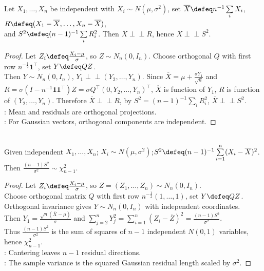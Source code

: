 \begin{theorem} \label{thm:normal-mean-residual-independence} \\
Let $X_1,\ldots,X_n$ be independent with $X_i\sim N(\mu,\sigma^2)$, set $\overline{X}\defeq n^{-1}\sum\limits_iX_i$, $R\defeq(X_1-\overline{X},\ldots,X_n-\overline{X})$,\\
and $S^2\defeq(n-1)^{-1}\sum\limits_iR_i^2$. Then $\overline{X}\perp\!\!\!\perp R$, hence $\overline{X}\perp\!\!\!\perp S^2$.
\begin{proof} Let $Z_i\defeq\frac{X_i-\mu}{\sigma}$, so $Z\sim N_n(0,I_n)$. Choose orthogonal $Q$ with first row $n^{-\frac{1}{2}}\mathbf{1}^\top$, set $Y\defeq QZ$.\\
Then $Y\sim N_n(0,I_n)$, $Y_1\perp\!\!\!\perp(Y_2,\ldots,Y_n)$. Since $\overline{X}=\mu+\frac{\sigma Y_1}{\sqrt n}$ and $R=\sigma(I-n^{-1}\mathbf{1}\mathbf{1}^\top)Z=\sigma Q^\top(0,Y_2,\ldots,Y_n)^\top$, $\overline{X}$ is function of $Y_1$, $R$ is function of $(Y_2,\ldots,Y_n)$. Therefore $\overline{X}\perp\!\!\!\perp R$, by $S^2=(n-1)^{-1}\sum\limits_iR_i^2$, $\overline{X}\perp\!\!\!\perp S^2$.\\
: Mean and residuals are orthogonal projections.\\
: For Gaussian vectors, orthogonal components are independent.
\end{proof}
\end{theorem}

\begin{theorem} \label{thm:normal-sample-variance-chi-square} \\
Given independent $X_1,\ldots,X_n$; $X_i\sim N(\mu,\sigma^2)$;$S^2\defeq(n-1)^{-1}\sum\limits_{i=1}^n(X_i-\overline{X})^2$. Then $\frac{(n-1)S^2}{\sigma^2}\sim\chi^2_{n-1}$.
\begin{proof} Let $Z_i\defeq\frac{X_i-\mu}{\sigma}$, so $Z=(Z_1,\ldots,Z_n)\sim N_n(0,I_n)$.\\
Choose orthogonal matrix $Q$ with first row $n^{-\frac{1}{2}}(1,\ldots,1)$, set $Y\defeq QZ$.\\
Orthogonal invariance gives $Y\sim N_n(0,I_n)$ with independent coordinates.\\
Then $Y_1=\frac{\sqrt n(\overline{X}-\mu)}{\sigma}$ and $\sum\limits_{j=2}^nY_j^2=\sum\limits_{i=1}^n(Z_i-\overline{Z})^2=\frac{(n-1)S^2}{\sigma^2}$.\\
Thus $\frac{(n-1)S^2}{\sigma^2}$ is the sum of squares of $n-1$ independent $N(0,1)$ variables, hence $\chi^2_{n-1}$.\\
: Cantering leaves $n-1$ residual directions.\\
: The sample variance is the squared Gaussian residual length scaled by $\sigma^2$.
\end{proof}
\end{theorem}

